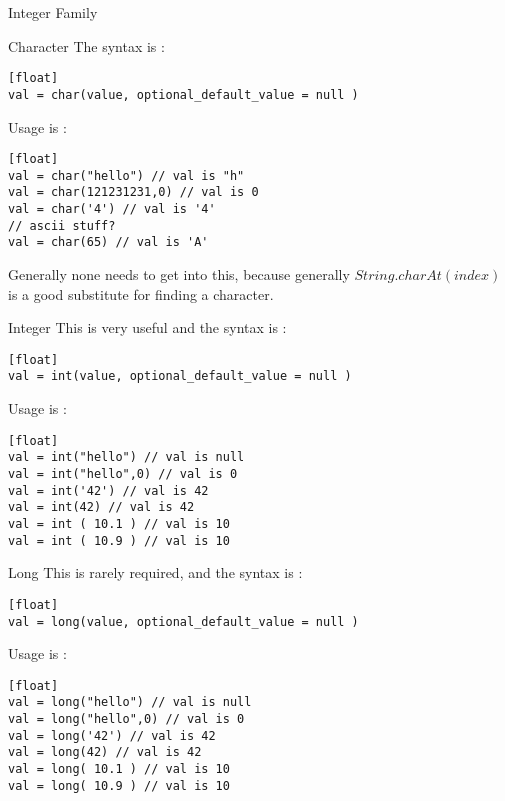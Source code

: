 \begin{section}{Integer Family}
\begin{subsection}{Character}
The syntax is :

\begin{lstlisting}[style=JexlStyle][float]
val = char(value, optional_default_value = null )
\end{lstlisting}

Usage is :

\begin{lstlisting}[style=JexlStyle][float]
val = char("hello") // val is "h"
val = char(121231231,0) // val is 0
val = char('4') // val is '4' 
// ascii stuff?
val = char(65) // val is 'A'  
\end{lstlisting}

Generally none needs to get into this, because generally $String.charAt(index)$ is a good substitute
for finding a character.
\end{subsection}

\begin{subsection}{Integer}
This is very useful and the syntax is :

\begin{lstlisting}[style=JexlStyle][float]
val = int(value, optional_default_value = null )
\end{lstlisting}

Usage is :

\begin{lstlisting}[style=JexlStyle][float]
val = int("hello") // val is null
val = int("hello",0) // val is 0
val = int('42') // val is 42 
val = int(42) // val is 42 
val = int ( 10.1 ) // val is 10 
val = int ( 10.9 ) // val is 10 
\end{lstlisting}

\end{subsection}


\begin{subsection}{Long}
This is rarely required, and the syntax is :

\begin{lstlisting}[style=JexlStyle][float]
val = long(value, optional_default_value = null )
\end{lstlisting}

Usage is :

\begin{lstlisting}[style=JexlStyle][float]
val = long("hello") // val is null
val = long("hello",0) // val is 0
val = long('42') // val is 42 
val = long(42) // val is 42 
val = long( 10.1 ) // val is 10 
val = long( 10.9 ) // val is 10 
\end{lstlisting}


\end{subsection}
\end{section}
